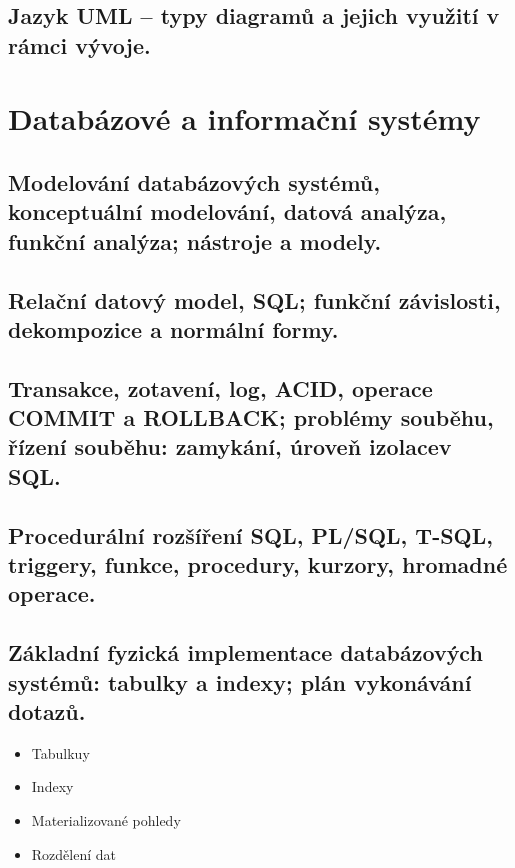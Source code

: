 \documentclass[openany]{book}
\begin{document}
\section{Jazyk UML – typy diagramů a jejich využití v rámci vývoje.}

\chapter{Databázové a informační systémy}

\section{Modelování databázových systémů, konceptuální modelování, datová analýza, funkční analýza; nástroje a modely. }

\section{Relační datový model, SQL; funkční závislosti, dekompozice a normální formy.}

\section{Transakce, zotavení, log, ACID, operace COMMIT a ROLLBACK; problémy souběhu, řízení souběhu: zamykání, úroveň izolacev SQL.}

\section{Procedurální rozšíření SQL, PL/SQL, T-SQL, triggery, funkce, procedury, kurzory, hromadné operace.}

\section{Základní fyzická implementace databázových systémů: tabulky a indexy; plán vykonávání dotazů.}
\begin{itemize}
    \item Tabulkuy
    \item Indexy
    \item Materializované pohledy
    \item Rozdělení dat
\end{itemize}
\end{document}
